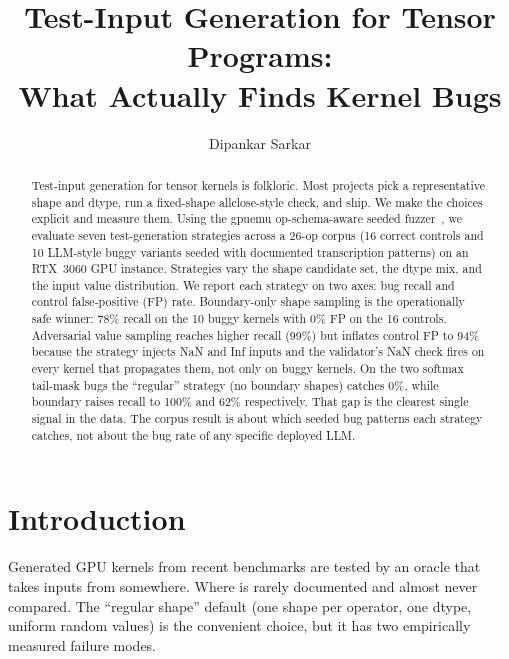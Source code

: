 \documentclass[runningheads]{llncs}
\begin{document}
\title{Test-Input Generation for Tensor Programs:\\What Actually Finds Kernel Bugs}

\author{Dipankar Sarkar}

\maketitle

\begin{abstract}
Test-input generation for tensor kernels is folkloric. Most projects
pick a representative shape and dtype, run a fixed-shape
allclose-style check, and ship. We make the choices explicit and
measure them. Using the gpuemu op-schema-aware seeded
fuzzer~\cite{gpuemuP1}, we evaluate seven test-generation strategies
across a 26-op corpus (16 correct controls and 10 LLM-style buggy
variants seeded with documented transcription patterns) on an
RTX~3060 GPU instance. Strategies vary the shape candidate set, the
dtype mix, and the input value distribution. We report each strategy
on two axes: bug recall and control false-positive (FP) rate.
Boundary-only shape sampling is the operationally safe winner: 78\%
recall on the 10 buggy kernels with 0\% FP on the 16 controls.
Adversarial value sampling reaches higher recall (99\%) but inflates
control FP to 94\% because the strategy injects NaN and Inf inputs
and the validator's NaN check fires on every kernel that propagates
them, not only on buggy kernels. On the two softmax tail-mask bugs the ``regular'' strategy (no
boundary shapes) catches 0\%, while boundary raises recall to 100\%
and 62\% respectively. That gap is the clearest single signal in the
data. The corpus result is about which seeded bug patterns each
strategy catches, not about the bug rate of any specific deployed
LLM.
\end{abstract}

\section{Introduction}
\label{sec:intro}

Generated GPU kernels from recent benchmarks
\cite{kernelbench2025,geak2025,kernelband2025,stark2025} are tested
by an oracle that takes inputs from somewhere. Where is rarely
documented and almost never compared. The ``regular shape'' default
(one shape per operator, one dtype, uniform random values) is the
convenient choice, but it has two empirically measured failure
modes.
\end{document}

